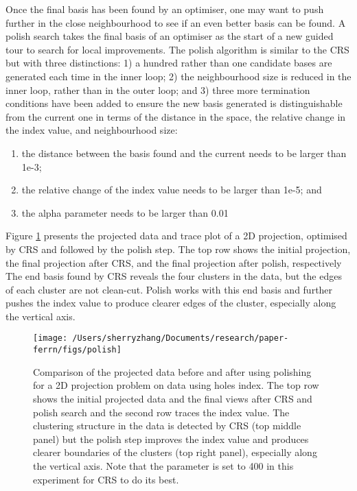 Once the final basis has been found by an optimiser, one may want to
push further in the close neighbourhood to see if an even better basis
can be found. A polish search takes the final basis of an optimiser as
the start of a new guided tour to search for local improvements. The
polish algorithm is similar to the CRS but with three distinctions: 1) a
hundred rather than one candidate bases are generated each time in the
inner loop; 2) the neighbourhood size is reduced in the inner loop,
rather than in the outer loop; and 3) three more termination conditions
have been added to ensure the new basis generated is distinguishable
from the current one in terms of the distance in the space, the relative
change in the index value, and neighbourhood size:

\begin{enumerate}
\def\labelenumi{\arabic{enumi})}
\tightlist
\item
  the distance between the basis found and the current needs to be
  larger than 1e-3;
\item
  the relative change of the index value needs to be larger than 1e-5;
  and
\item
  the alpha parameter needs to be larger than 0.01
\end{enumerate}

Figure \ref{fig:polish} presents the projected data and trace plot of a
2D projection, optimised by CRS and followed by the polish step. The top
row shows the initial projection, the final projection after CRS, and
the final projection after polish, respectively The end basis found by
CRS reveals the four clusters in the data, but the edges of each cluster
are not clean-cut. Polish works with this end basis and further pushes
the index value to produce clearer edges of the cluster, especially
along the vertical axis.

\begin{Schunk}
\begin{figure}

{\centering \texttt{[image: /Users/sherryzhang/Documents/research/paper-ferrn/figs/polish]} 

}

\caption{Comparison of the projected data before and after using polishing for a 2D projection problem on  data using holes index. The top row shows the initial projected data and the final views after CRS and polish search and the second row traces the index value. The clustering structure in the data is detected by CRS (top middle panel) but the polish step improves the index value and produces clearer boundaries of the clusters (top right panel), especially along the vertical axis. Note that the parameter  is set to 400 in this experiment for CRS to do its best. }\label{fig:polish}
\end{figure}
\end{Schunk}

